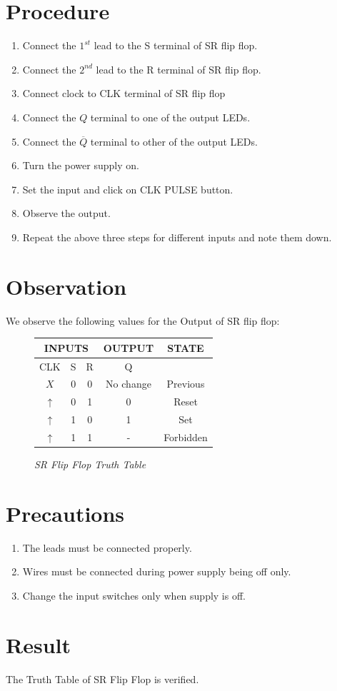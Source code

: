 \section{Procedure}
\begin{enumerate}
	\tightlist
	\item Connect the $1^{st}$ lead to the S terminal of SR flip flop.
	\item Connect the $2^{nd}$ lead to the R terminal of SR flip flop.
	\item Connect clock to CLK terminal of SR flip flop
	\item Connect the $Q$ terminal to one of the output LEDs.
	\item Connect the $\overline{Q}$ terminal to other of the output LEDs.
	\item Turn the power supply on.
	\item Set the input and click on CLK PULSE button.
	\item Observe the output.
	\item Repeat the above three steps for different inputs and note them down.
\end{enumerate}

\section{Observation}
	We observe the following values for the Output of SR flip flop:
	\begin{figure}
		\centering
		\begin{tabular}{|c|c|c|c|c|}
			\hline
			\multicolumn{3}{|c|}{INPUTS} & OUTPUT & STATE \\
			\hline
			CLK & S & R & Q &  \\
			\hline
			$X$ & 0 & 0 & No change & Previous \\
			\hline
			$\uparrow$ & 0 & 1 & 0 & Reset \\
			\hline
			$\uparrow$ & 1 & 0 & 1 & Set \\
			\hline
			$\uparrow$ & 1 & 1 & - & Forbidden \\
			\hline
		\end{tabular}
	\label{fig:SR_flipflop_table}		
	\caption{\textit{SR Flip Flop Truth Table}}	
	\end{figure}
\section{Precautions}
\begin{enumerate}
	\tightlist
	\item The leads must be connected properly.
	\item Wires must be connected during power supply being off only.
	\item Change the input switches only when supply is off.
\end{enumerate}

\section{Result}
The Truth Table of SR Flip Flop is verified.